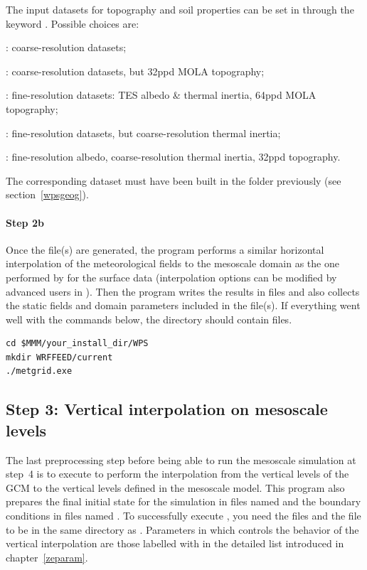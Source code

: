 \sk
The input datasets for topography and soil properties can be set in  through the keyword . Possible choices are:
\begin{citemize}
\item {}: coarse-resolution datasets;
\item {}: coarse-resolution datasets, but 32ppd MOLA topography;
\item {}: fine-resolution datasets: TES albedo \& thermal inertia, 64ppd MOLA topography;
\item {}: fine-resolution datasets, but coarse-resolution thermal inertia;
\item {}: fine-resolution albedo, coarse-resolution thermal inertia, 32ppd topography.
\end{citemize}
The corresponding dataset must have been built in the  folder previously (see section~\ref{wpsgeog}).

\sk
\paragraph{Step 2b} Once the  file(s) are generated, the  program performs a similar horizontal interpolation of the meteorological fields to the mesoscale domain as the one performed by  for the surface data (interpolation options can be modified by advanced users in ). Then the program writes the results in  files and also collects the static fields and domain parameters included in the  file(s). If everything went well with the commands below, the directory  should contain  files.

\begin{verbatim}
cd $MMM/your_install_dir/WPS
mkdir WRFFEED/current
./metgrid.exe
\end{verbatim}

\sk
\subsection{Step 3: Vertical interpolation on mesoscale levels}\label{real.exe}

\sk
The last preprocessing step before being able to run the mesoscale simulation at step~4 is to execute  to perform the interpolation from the vertical levels of the GCM to the vertical levels defined in the mesoscale model. This program also prepares the final initial state for the simulation in files named  and the boundary conditions in files named . To successfully execute , you need the  files and the  file to be in the same directory as . Parameters in  which controls the behavior of the vertical interpolation are those labelled with  in the detailed list introduced in chapter~\ref{zeparam}. 

